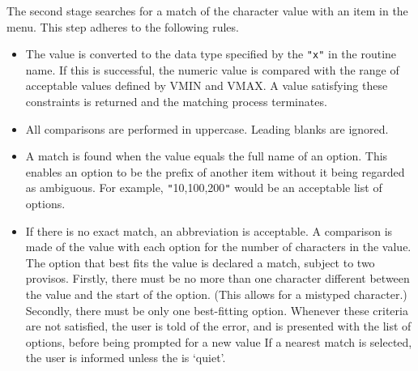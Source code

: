 \documentclass[twoside,11pt,nolof]{starlink}
\begin{document}
{{{      The second stage searches for a match of the character value with
      an item in the menu.  This step adheres to the following rules.
         \begin{itemize}
         \item  The value is converted to the data type specified by the
         \texttt{"x"} in the routine name.  If this is successful, the numeric
         value is compared with the range of acceptable values defined
         by VMIN and VMAX.  A value satisfying these constraints is
         returned and the matching process terminates.
         \item  All comparisons are performed in uppercase.  Leading blanks
         are ignored.
         \item  A match is found when the value equals the full name of an
         option.  This enables an option to be the prefix of another
         item without it being regarded as ambiguous.  For example,
         \texttt{"}10,100,200\texttt{"} would be an acceptable list of options.
         \item If there is no exact match, an abbreviation is acceptable.
         A comparison is made of the value with each option for the
         number of characters in the value.  The option that best fits
         the value is declared a match, subject to two provisos.
         Firstly, there must be no more than one character different
         between the value and the start of the option.  (This allows
         for a mistyped character.)  Secondly, there must be only one
         best-fitting option.  Whenever these criteria are not
         satisfied, the user is told of the error, and is presented
         with the list of options, before being prompted for a new value
         If a nearest match is selected, the user is informed unless the
 is `quiet'.
         \end{itemize}
      }
   }
}
\end{document}
